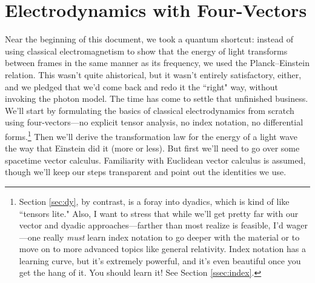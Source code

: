 \documentclass[12pt]{article}
\renewcommand{\vv}[1]{\mathbf{#1}}
\begin{document}



\clearpage

\section{Electrodynamics with Four-Vectors}\label{sec:rem}

Near the beginning of this document, we took a quantum shortcut: instead of using classical electromagnetism to show that the energy of light transforms between frames in the same manner as its frequency, we used the Planck--Einstein relation. This wasn't quite ahistorical, but it wasn't entirely satisfactory, either, and we pledged that we'd come back and redo it the ``right" way, without invoking the photon model. The time has come to settle that unfinished business. We'll start by formulating the basics of classical electrodynamics from scratch using four-vectors---no explicit tensor analysis, no index notation, no differential forms.\footnote{Section \ref{sec:dy}, by contrast, is a foray into dyadics, which is kind of like ``tensors lite." Also, I want to stress that while we'll get pretty far with our vector and dyadic approaches---farther than most realize is feasible, I'd wager---one really \emph{must} learn index notation to go deeper with the material or to move on to more advanced topics like general relativity. Index notation has a learning curve, but it's extremely powerful, and it's even beautiful once you get the hang of it. You should learn it! See Section \ref{ssec:index}.} Then we'll derive the transformation law for the energy of a light wave the way that Einstein did it (more or less). But first we'll need to go over some spacetime vector calculus. Familiarity with Euclidean vector calculus is assumed, though we'll keep our steps transparent and point out the identities we use.
\end{document}
